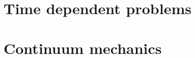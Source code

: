 \documentclass{scrbook}
\begin{document}
\chapter{Time dependent problems}\label{chapter:dependent}

\chapter{Continuum mechanics}\label{chapter:continuum}



\end{document}
